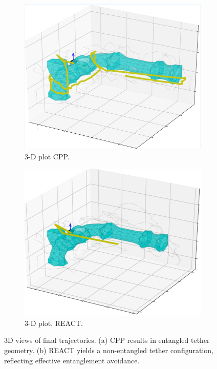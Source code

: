 \begin{figure}[ht]
    \centering
    \begin{subfigure}[b]{0.48\linewidth}
        \centering
        \includegraphics[width=\linewidth]{EA-Planner/figures/fc_planner_final_view.pdf}
        \caption{3-D plot CPP.}
        \label{fig:3d_cpp}
    \end{subfigure}
    \hfill
    \begin{subfigure}[b]{0.48\linewidth}
        \centering
        \includegraphics[width=\linewidth]{EA-Planner/figures/react_pipe.pdf}
        \caption{3-D plot, \ac{REACT}.}
        \label{fig:3d_oea}
    \end{subfigure}
    \caption{3D views of final trajectories. (a) CPP results in entangled tether geometry. (b) \ac{REACT} yields a non-entangled tether configuration, reflecting effective entanglement avoidance.}
    \label{fig:3Dplots}
\end{figure}




